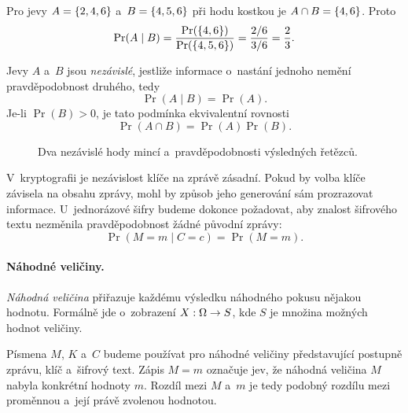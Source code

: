 Pro jevy $A=\left\{2,4,6\right\}$ a~$B=\left\{4,5,6\right\}$ při hodu kostkou je $A\cap B=\left\{4,6\right\}$. Proto
\[
    \Pr(A\mid B)
    =
    \frac{\Pr(\left\{4,6\right\})}{\Pr(\left\{4,5,6\right\})}
    =
    \frac{2/6}{3/6}
    =
    \frac{2}{3}.
\]

\begin{definition}
    Jevy $A$ a~$B$ jsou \emph{nezávislé}, jestliže informace o~nastání jednoho nemění pravděpodobnost druhého, tedy
    \[
        \Pr(A\mid B)=\Pr(A).
    \]
    Je-li $\Pr(B)>0$, je tato podmínka ekvivalentní rovnosti
    \[
        \Pr(A\cap B)=\Pr(A)\Pr(B).
    \]
\end{definition}

\begin{figure}[ht]
    \centering
    
    \caption{Dva nezávislé hody mincí a~pravděpodobnosti výsledných řetězců.}
    \label{fig:krypto-pravdepodobnost-strom}
\end{figure}

V~kryptografii je nezávislost klíče na zprávě zásadní. Pokud by volba klíče závisela na obsahu zprávy, mohl by způsob jeho generování sám prozrazovat informace. U~jednorázové šifry budeme dokonce požadovat, aby znalost šifrového textu nezměnila pravděpodobnost žádné původní zprávy:
\[
    \Pr(M=m\mid C=c)=\Pr(M=m).
\]

\paragraph{Náhodné veličiny.}

\begin{definition}
    \emph{Náhodná veličina} přiřazuje každému výsledku náhodného pokusu nějakou hodnotu. Formálně jde o~zobrazení $X:\Omega \rightarrow S$, kde $S$ je množina možných hodnot veličiny.
\end{definition}

Písmena $M$, $K$ a~$C$ budeme používat pro náhodné veličiny představující postupně zprávu, klíč a~šifrový text. Zápis $M=m$ označuje jev, že náhodná veličina $M$ nabyla konkrétní hodnoty $m$. Rozdíl mezi $M$ a~$m$ je tedy podobný rozdílu mezi proměnnou a~její právě zvolenou hodnotou.

